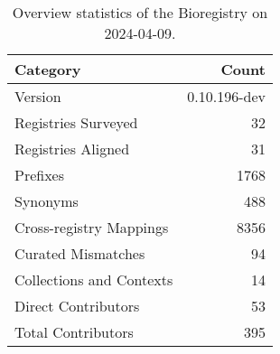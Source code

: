\begin{table}
\caption{Overview statistics of the Bioregistry on 2024-04-09.}
\label{tab:bioregistry-summary}
\begin{tabular}{lr}
\toprule
Category & Count \\
\midrule
Version & 0.10.196-dev \\
Registries Surveyed & 32 \\
Registries Aligned & 31 \\
Prefixes & 1768 \\
Synonyms & 488 \\
Cross-registry Mappings & 8356 \\
Curated Mismatches & 94 \\
Collections and Contexts & 14 \\
Direct Contributors & 53 \\
Total Contributors & 395 \\
\bottomrule
\end{tabular}
\end{table}
